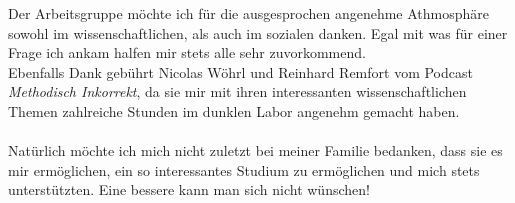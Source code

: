 \documentclass[bachelor,       %
               twoside,        %
               BCOR10mm,       %
               english,ngerman, %
               final,          %
               ]{GAUBM}
\begin{document}
Der Arbeitsgruppe möchte ich für die ausgesprochen angenehme Athmosphäre sowohl im wissenschaftlichen, als auch im sozialen danken.
Egal mit was für einer Frage ich ankam halfen mir stets alle sehr zuvorkommend.\\

Ebenfalls Dank gebührt Nicolas Wöhrl und Reinhard Remfort vom Podcast \textit{Methodisch Inkorrekt}, da sie mir mit ihren interessanten wissenschaftlichen Themen zahlreiche Stunden im dunklen Labor angenehm gemacht haben.\\\\

Natürlich möchte ich mich nicht zuletzt bei meiner Familie bedanken, dass sie es mir ermöglichen, ein so interessantes Studium zu ermöglichen und mich stets unterstützten.
Eine bessere kann man sich nicht wünschen!
\end{document}
